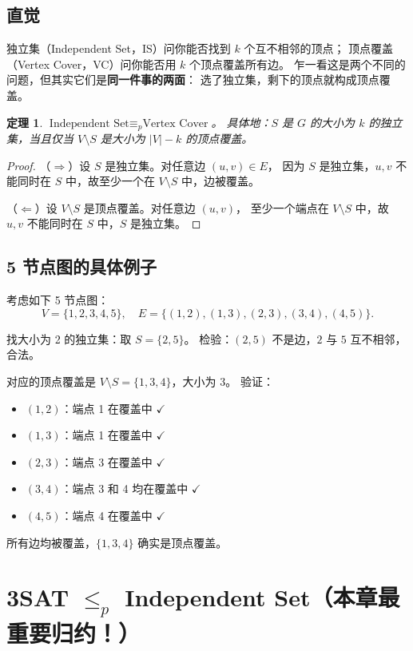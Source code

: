 \documentclass[UTF8,openany,12pt]{ctexbook}
\newtheorem{theorem}{定理}[chapter]
\theoremstyle{remark}
\begin{document}
\subsection{直觉}

独立集（Independent Set，IS）问你能否找到 $k$ 个互不相邻的顶点；
顶点覆盖（Vertex Cover，VC）问你能否用 $k$ 个顶点覆盖所有边。
乍一看这是两个不同的问题，但其实它们是\textbf{同一件事的两面}：
选了独立集，剩下的顶点就构成顶点覆盖。

\begin{theorem}
  $\text{Independent Set} \equiv_p \text{Vertex Cover}$。
  具体地：$S$ 是 $G$ 的大小为 $k$ 的独立集，当且仅当 $V \setminus S$ 是大小为 $|V|-k$ 的顶点覆盖。
\end{theorem}

\begin{proof}
（$\Rightarrow$）设 $S$ 是独立集。对任意边 $(u,v) \in E$，
因为 $S$ 是独立集，$u,v$ 不能同时在 $S$ 中，故至少一个在 $V \setminus S$ 中，边被覆盖。

（$\Leftarrow$）设 $V \setminus S$ 是顶点覆盖。对任意边 $(u,v)$，
至少一个端点在 $V \setminus S$ 中，故 $u,v$ 不能同时在 $S$ 中，$S$ 是独立集。
\end{proof}

\subsection{5 节点图的具体例子}

考虑如下 5 节点图：
\[
  V = \{1,2,3,4,5\},\quad
  E = \{(1,2),(1,3),(2,3),(3,4),(4,5)\}.
\]

找大小为 2 的独立集：取 $S = \{2, 5\}$。
检验：$(2,5)$ 不是边，$2$ 与 $5$ 互不相邻，合法。

对应的顶点覆盖是 $V \setminus S = \{1, 3, 4\}$，大小为 3。
验证：
\begin{itemize}
  \item $(1,2)$：端点 1 在覆盖中 $\checkmark$
  \item $(1,3)$：端点 1 在覆盖中 $\checkmark$
  \item $(2,3)$：端点 3 在覆盖中 $\checkmark$
  \item $(3,4)$：端点 3 和 4 均在覆盖中 $\checkmark$
  \item $(4,5)$：端点 4 在覆盖中 $\checkmark$
\end{itemize}
所有边均被覆盖，$\{1,3,4\}$ 确实是顶点覆盖。

\section[3SAT 归约到 Independent Set]{3SAT $\le_p$ Independent Set（本章最重要归约！）}
\end{document}
